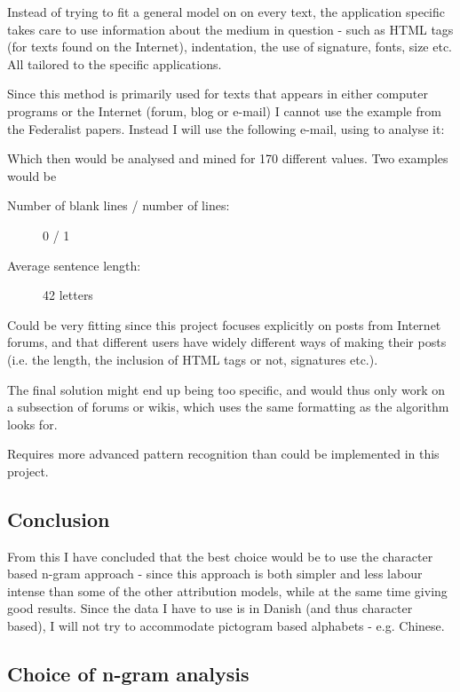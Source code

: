{\label{application}
Instead of trying to fit a general model on on every text, the application specific takes care to use information about the medium in question - such as HTML tags (for texts found on the Internet), indentation, the use of signature, fonts, size etc. All tailored to the specific applications.
}
{
Since this method is primarily used for texts that appears in either computer programs or the Internet (forum, blog or e-mail) I cannot use the example from the Federalist papers. Instead I will use the following e-mail, using \cite{Vel01mininge-mail} to analyse it: 


Which then would be analysed and mined for 170 different values. Two examples would be
\begin{description}
\item[Number of blank lines / number of lines:] 0 / 1
\item[Average sentence length:] 42 letters
\end{description}
}{
\item Could be very fitting since this project focuses explicitly on posts from Internet forums, and that different users have widely different ways of making their posts (i.e. the length, the inclusion of HTML tags or not, signatures etc.).
}{
\item The final solution might end up being too specific, and would thus only work on a subsection of forums or wikis, which uses the same formatting as the algorithm looks for.
\item Requires more advanced pattern recognition than could be implemented in this project. 
}

\subsection{Conclusion}
\label{technique:conclusion}
From this I have concluded that the best choice would be to use the character based n-gram approach - since this approach is both simpler and less labour intense than some of the other attribution models, while at the same time giving good results. Since the data I have to use is in Danish (and thus character based), I will not try to accommodate pictogram based alphabets - e.g. Chinese.


\subsection{Choice of n-gram analysis}

